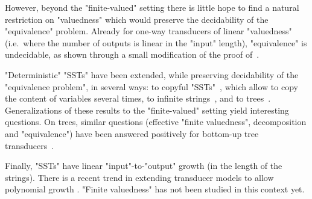 \documentclass{theoretics}
\begin{document}
However, beyond the "finite-valued" setting there is little hope to 
find a natural restriction on "valuedness" which would preserve 
the decidability of the "equivalence" problem. Already for 
one-way transducers of linear "valuedness" (i.e.~where the number 
of outputs is linear in the "input" length), "equivalence" is
undecidable, as shown through a small modification of the 
proof of~\cite{iba78siam}. 


"Deterministic" "SSTs" have been extended,
while preserving decidability of the "equivalence problem",
in several ways:
to copyful "SSTs"~\cite{DBLP:journals/siglog/Bojanczyk19a,DBLP:journals/fuin/FiliotR21},
which allow to copy the content of variables several times, 
to infinite strings~\cite{DBLP:conf/lics/AlurFT12}, and to
trees~\cite{DBLP:journals/jacm/AlurD17}. 
Generalizations of these results to the "finite-valued" setting 
yield interesting questions. On trees, similar questions 
(effective "finite valuedness", decomposition and "equivalence") 
have been answered positively for bottom-up tree
transducers~\cite{DBLP:journals/mst/Seidl94}.


Finally, "SSTs" have linear "input"-to-"output" growth (in the length of the
strings). There is a recent trend in extending transducer models 
to allow polynomial growth
\cite{DBLP:conf/icalp/BojanczykKL19,DBLP:conf/lics/Bojanczyk22,DBLP:conf/lics/Bojanczyk23a,GaetanPhD}.
"Finite valuedness" has not  been studied in this context yet.


    \printbibliography

% 
% 
\end{document}
